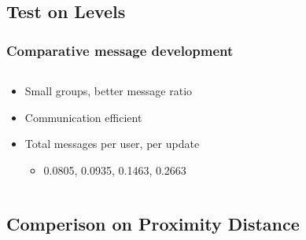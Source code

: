 \subsection{Test on Levels}
\begin{frame}[red] %
\frametitle{Comparative message development}
\begin{columns}
\begin{column}{0.5\textwidth}
\begin{itemize}
	\item Small groups, better message ratio
	\item Communication efficient
	\item Total messages per user, per update
	\begin{itemize}
		\item 0.0805, 0.0935, 0.1463, 0.2663
	\end{itemize}
\end{itemize}
\vspace{5cm}
\end{column}
\begin{column}{0.5\textwidth}
\end{column}
\end{columns}
\end{frame}


\subsection{Comperison on Proximity Distance} %

